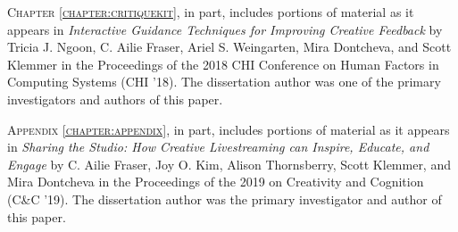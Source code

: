 \textsc{Chapter \ref{chapter:critiquekit}}, in part, includes portions of material as it appears in \textit{Interactive Guidance Techniques for Improving Creative Feedback} by Tricia J. Ngoon, C. Ailie Fraser, Ariel S. Weingarten, Mira Dontcheva, and Scott Klemmer in the Proceedings of the 2018 CHI Conference on Human Factors in Computing Systems (CHI '18). The dissertation author was one of the primary investigators and authors of this paper.

\textsc{Appendix \ref{chapter:appendix}}, in part, includes portions of material as it appears in \textit{Sharing the Studio: How Creative Livestreaming can Inspire, Educate, and Engage} by C. Ailie Fraser, Joy O. Kim, Alison Thornsberry, Scott Klemmer, and Mira Dontcheva in the Proceedings of the 2019 on Creativity and Cognition (C\&C '19). The dissertation author was the primary investigator and author of this paper.